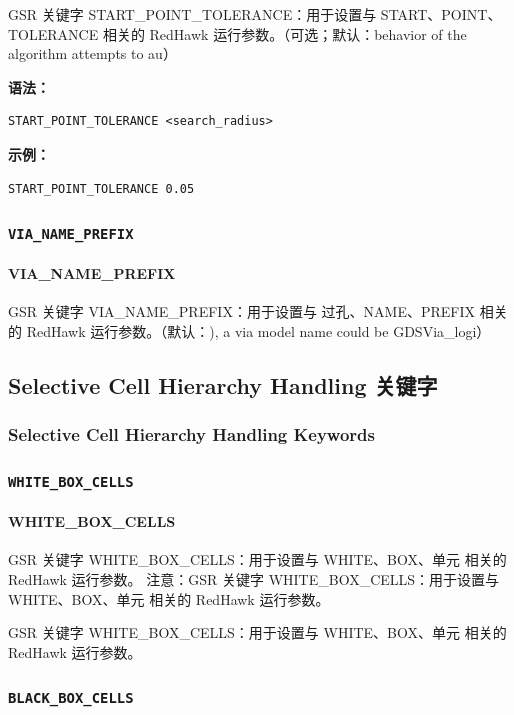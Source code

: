 GSR 关键字 START_POINT_TOLERANCE：用于设置与 START、POINT、TOLERANCE 相关的 RedHawk 运行参数。（可选；默认：behavior of the algorithm attempts to au）

\textbf{语法：}
\begin{lstlisting}
START_POINT_TOLERANCE <search_radius>
\end{lstlisting}

\textbf{示例：}
\begin{lstlisting}
START_POINT_TOLERANCE 0.05
\end{lstlisting}

\subsubsection{\texttt{VIA_NAME_PREFIX}}
\paragraph*{VIA_NAME_PREFIX}

GSR 关键字 VIA_NAME_PREFIX：用于设置与 过孔、NAME、PREFIX 相关的 RedHawk 运行参数。（默认：), a via model name could be GDSVia_logi）

\subsection{Selective Cell Hierarchy Handling 关键字}
\subsubsection*{Selective Cell Hierarchy Handling Keywords}

\subsubsection{\texttt{WHITE_BOX_CELLS}}
\paragraph*{WHITE_BOX_CELLS}

GSR 关键字 WHITE_BOX_CELLS：用于设置与 WHITE、BOX、单元 相关的 RedHawk 运行参数。 注意：GSR 关键字 WHITE_BOX_CELLS：用于设置与 WHITE、BOX、单元 相关的 RedHawk 运行参数。

\begin{noteBox}
GSR 关键字 WHITE\_BOX\_CELLS：用于设置与 WHITE、BOX、单元 相关的 RedHawk 运行参数。
\end{noteBox}

\subsubsection{\texttt{BLACK_BOX_CELLS}}
